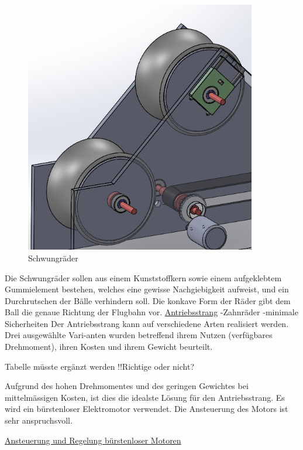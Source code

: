 \begin{figure}
	\centering
	\includegraphics[width=0.9\textwidth]{Enddokumentation/Loesungskonzept/Bilder/Schwungraeder.png}
	\caption{Schwungräder}
	\label{fig:Schwungräder}	
\end{figure}
Die Schwungräder sollen aus einem Kunststoffkern sowie einem aufgeklebtem Gummielement bestehen, welches eine gewisse Nachgiebigkeit aufweist, und ein Durchrutschen der Bälle verhindern soll.  Die konkave Form der Räder gibt dem Ball die genaue Richtung der Flugbahn vor.
\newline\underline{Antriebsstrang}
-Zahnräder
-minimale Sicherheiten
Der Antriebsstrang kann auf verschiedene Arten realisiert werden. Drei ausgewählte Vari-anten wurden betreffend ihrem Nutzen (verfügbares Drehmoment), ihren Kosten und ihrem Gewicht beurteilt.
\begin{table}
	\centering
	\label{tab:Antriebsstrang}
	Tabelle müsste ergänzt werden !!Richtige oder nicht?
\end{table}

Aufgrund des hohen Drehmomentes und des geringen Gewichtes bei mittelmässigen Kosten, ist dies die idealste Lösung für den Antriebsstrang. Es wird ein bürstenloser Elektromotor verwendet. Die Ansteuerung des Motors ist sehr anspruchsvoll.

\newline\underline{Ansteuerung und Regelung bürstenloser Motoren}
